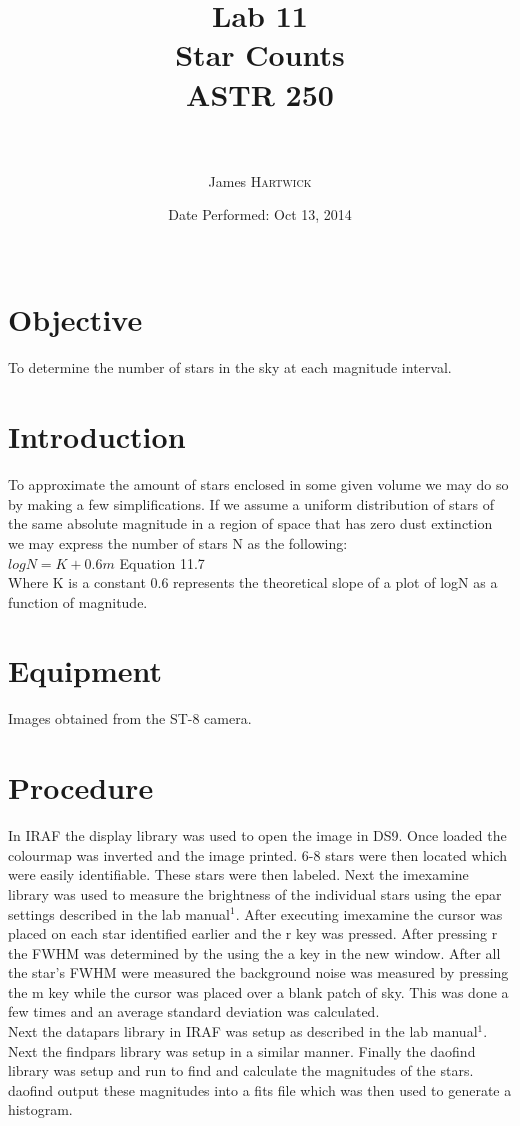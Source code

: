 \documentclass{article}
\title{Lab 11 \\ Star Counts \\ ASTR 250\\ \ \\ } %
\author{James \textsc{Hartwick}} %
\date{Date Performed: Oct 13, 2014\\ \ } %
\begin{document}
\maketitle %


\section{Objective}
To determine the number of stars in the sky at each magnitude interval.
\section{Introduction}
To approximate the amount of stars enclosed in some given volume we may do so by making a few simplifications. If we assume a uniform distribution of stars of the same absolute magnitude in a region of space that has zero dust extinction we may express the number of stars N as the following:\\

$logN=K+0.6m$ Equation 11.7\\

Where K is a constant 0.6 represents the theoretical slope of a plot of logN as a function of magnitude. 
\section{Equipment}
Images obtained from the ST-8 camera.
\section{Procedure}
In IRAF the display library was used to open the image in DS9. Once loaded the colourmap was inverted and the image printed. 6-8 stars were then located which were easily identifiable. These stars were then labeled. Next the imexamine library was used to measure the brightness of the individual stars using the epar settings described in the lab manual$^1$. After executing imexamine the cursor was placed on each star identified earlier and the r key was pressed. After pressing r the FWHM was determined by the using the a key in the new window. After all the star's FWHM were measured the background noise was measured by pressing the m key while the cursor was placed over a blank patch of sky. This was done a few times and an average standard deviation was calculated.\\

Next the datapars library in IRAF was setup as described in the lab manual$^1$. Next the findpars library was setup in a similar manner. Finally the daofind library was setup and run to find and calculate the magnitudes of the stars. daofind output these magnitudes into a fits file which was then used to generate a histogram.\\
\end{document}
